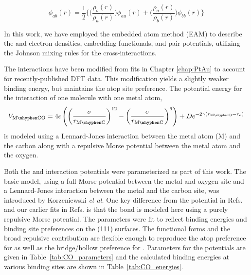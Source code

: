 \begin{equation*} 
\phi_{ab}(r) = \frac{1}{2}
\bigg\{ \bigg(
\frac{\rho_b(r)}{\rho_a(r)}
\bigg) \phi_{aa}(r)
+ \bigg(
\frac{\rho_a(r)}{\rho_b(r)}
\bigg)\phi_{bb}(r) 
\bigg\}
\end{equation*} 

In this work, we have employed the embedded atom method (EAM) to describe the
 and  electron densities, embedding functionals, and pair
potentials,\citep{Foiles:1986ky} utilizing the Johnson mixing rules for the
 cross-interactions.\citep{Johnson:1989yr}

The  interactions have been modified from 
fits in Chapter \ref{chap:PtAu} to account for recently-published DFT
data.\citep{Deshlahra:2012aa} This modification yields a slightly weaker
 binding energy, but maintains the atop site
preference.  The potential energy for the interaction of one 
molecule with one metal atom,
\begin{equation*}
V_\mathrm{M\mhyphen CO} = 4 \epsilon \left(
  \left(\frac{\sigma}{r_\mathrm{M\mhyphen C}}\right)^{12} -
  \left(\frac{\sigma}{r_\mathrm{M\mhyphen C}}\right)^6 \right) +
D e^{-2 \gamma (r_\mathrm{M\mhyphen O} - r_e)}
\label{eq:pot}
\end{equation*}
is modeled using a Lennard-Jones interaction between the metal atom
(M) and the carbon along with a repulsive Morse potential between the
metal atom and the oxygen.

Both the  and  interaction
potentials were parameterized as part of this work. The basic model,
using a full Morse potential between the metal and oxygen site and a
Lennard-Jones interaction between the metal and the carbon site, was
introduced by Korzeniewski \textit{et al.}\citep{Korzeniewski:1986kl} One key
difference from the potential in Refs.\citep{Korzeniewski:1986kl} and our
earlier fits in Refs.\citep{Michalka:2013aa} is that the
 bond is modeled here using a purely repulsive Morse
potential. The parameters were fit to reflect binding energies and
binding site preferences on the (111) surfaces.  The functional
forms and the broad repulsive  contribution are
flexible enough to reproduce the atop preference for 
as well as the bridge/hollow preference for .
Parameters for the potentials are given in
Table~\ref{tab:CO_parameters} and the calculated binding energies at
various binding sites are shown in Table~\ref{tab:CO_energies}.

